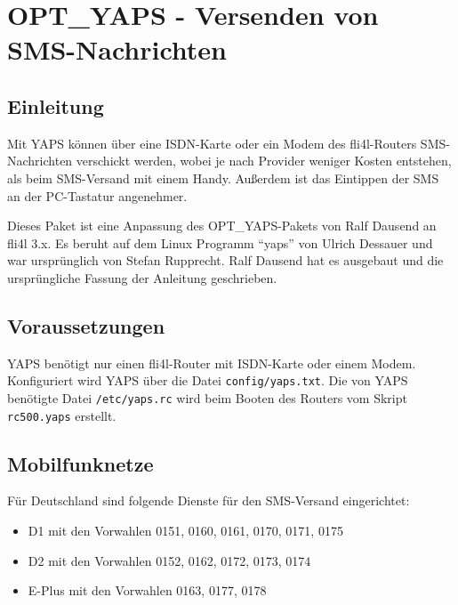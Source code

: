 \section {OPT\_YAPS - Versenden von SMS-Nachrichten}

\subsection {Einleitung}

Mit YAPS können über eine ISDN-Karte oder ein Modem des fli4l-Routers
SMS-Nachrichten verschickt werden, wobei je nach Provider weniger Kosten
entstehen, als beim SMS-Versand mit einem Handy. Außerdem ist das Eintippen
der SMS an der PC-Tastatur angenehmer.

Dieses Paket ist eine Anpassung des OPT\_YAPS-Pakets von Ralf Dausend
an fli4l 3.x. Es beruht auf dem Linux Programm ``yaps'' von Ulrich Dessauer
und war ursprünglich von Stefan Rupprecht. Ralf Dausend hat es ausgebaut und
die ursprüngliche Fassung der Anleitung geschrieben.

\subsection {Voraussetzungen}

YAPS benötigt nur einen fli4l-Router mit ISDN-Karte oder einem Modem.
Konfiguriert wird YAPS über die Datei \texttt{config/yaps.txt}. Die von YAPS
benötigte Datei \texttt{/etc/yaps.rc} wird beim Booten des Routers vom Skript
\texttt{rc500.yaps} erstellt.


\subsection {Mobilfunknetze}

Für Deutschland sind folgende Dienste für den SMS-Versand eingerichtet:
\begin{itemize}
\item D1 mit den Vorwahlen 0151, 0160, 0161, 0170, 0171, 0175
\item D2 mit den Vorwahlen 0152, 0162, 0172, 0173, 0174
\item E-Plus mit den Vorwahlen 0163, 0177, 0178
\end{itemize}

